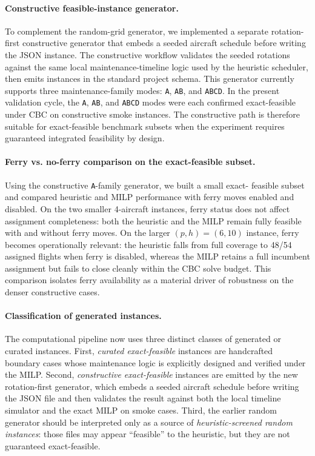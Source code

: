 \paragraph{Constructive feasible-instance generator.}
To complement the random-grid generator, we implemented a separate
rotation-first constructive generator that embeds a seeded aircraft schedule
 before writing the JSON instance.  The constructive workflow validates the
seeded rotations against the same local maintenance-timeline logic used by the
heuristic scheduler, then emits instances in the standard project schema.
This generator currently supports three maintenance-family modes:
\texttt{A}, \texttt{AB}, and \texttt{ABCD}.  In the present validation cycle,
the \texttt{A}, \texttt{AB}, and \texttt{ABCD} modes were each confirmed
exact-feasible under CBC on constructive smoke instances.  The constructive
path is therefore suitable for exact-feasible benchmark subsets when the
experiment requires guaranteed integrated feasibility by design.

\paragraph{Ferry vs. no-ferry comparison on the exact-feasible subset.}
Using the constructive \texttt{A}-family generator, we built a small exact-
feasible subset and compared heuristic and MILP performance with ferry moves
enabled and disabled.  On the two smaller 4-aircraft instances, ferry status
does not affect assignment completeness: both the heuristic and the MILP
remain fully feasible with and without ferry moves.  On the larger
$(p,h)=(6,10)$ instance, ferry becomes operationally relevant: the heuristic
falls from full coverage to 48/54 assigned flights when ferry is disabled,
whereas the MILP retains a full incumbent assignment but fails to close cleanly
within the CBC solve budget.  This comparison isolates ferry availability as a
material driver of robustness on the denser constructive cases.

\paragraph{Classification of generated instances.}
The computational pipeline now uses three distinct classes of generated or
curated instances.  First, \emph{curated exact-feasible} instances are
handcrafted boundary cases whose maintenance logic is explicitly designed and
verified under the MILP.  Second, \emph{constructive exact-feasible}
instances are emitted by the new rotation-first generator, which embeds a
seeded aircraft schedule before writing the JSON file and then validates the
result against both the local timeline simulator and the exact MILP on smoke
cases.  Third, the earlier random generator should be interpreted only as a
source of \emph{heuristic-screened random instances}: those files may appear
``feasible'' to the heuristic, but they are not guaranteed exact-feasible.

